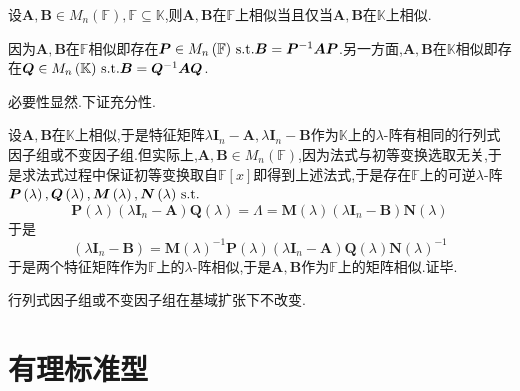 \begin{formal}
\begin{theorem}[相似关系的扩张]\label{thm:相似关系的扩张}
    设$\bm{A},\bm{B}\in M_n\left(\mathbb{F}\right),\mathbb{F}\subseteq \mathbb{K}$,则$\bm{A},\bm{B}$在$\mathbb{F}$上相似当且仅当$\bm{A},\bm{B}$在$\mathbb{K}$上相似.
\end{theorem}
\begin{Proof}
因为$\bm{A},\bm{B}$在$\mathbb{F}$相似即存在$\bm{P}\in M_n\left(\mathbb{F}\right)\,\textup{s.t.}\bm{B}=\bm{P}^{-1}\bm{AP}$.另一方面,$\bm{A},\bm{B}$在$\mathbb{K}$相似即存在$\bm{Q}\in M_n\left(\mathbb{K}\right)\,\textup{s.t.}\bm{B}=\bm{Q}^{-1}\bm{AQ}$.

必要性显然.下证充分性.

设$\bm{A},\bm{B}$在$\mathbb{K}$上相似,于是特征矩阵$\lambda\bm{I}_n-\bm{A},\lambda\bm{I}_n-\bm{B}$作为$\mathbb{K}$上的$\lambda$-阵有相同的行列式因子组或不变因子组.但实际上,$\bm{A},\bm{B}\in M_n\left(\mathbb{F}\right)$,因为法式与初等变换选取无关,于是求法式过程中保证初等变换取自$\mathbb{F}\left[x\right]$即得到上述法式,于是存在$\mathbb{F}$上的可逆$\lambda$-阵$\bm{P}\left(\lambda\right),\bm{Q}\left(\lambda\right),\bm{M}\left(\lambda\right),\bm{N}\left(\lambda\right)\,\textup{s.t.}$
\[
\bm{P}\left(\lambda\right)\left(\lambda\bm{I}_n-\bm{A}\right)\bm{Q}\left(\lambda\right)=\bm{\varLambda}=\bm{M}\left(\lambda\right)\left(\lambda\bm{I}_n-\bm{B}\right)\bm{N}\left(\lambda\right)
\]于是
\[
\left(\lambda\bm{I}_n-\bm{B}\right)=
\bm{M}\left(\lambda\right)^{-1}
\bm{P}\left(\lambda\right)\left(\lambda\bm{I}_n-\bm{A}\right)\bm{Q}\left(\lambda\right)
\bm{N}\left(\lambda\right)^{-1}
\]
于是两个特征矩阵作为$\mathbb{F}$上的$\lambda$-阵相似,于是$\bm{A},\bm{B}$作为$\mathbb{F}$上的矩阵相似.证毕.
\end{Proof}
\end{formal}
\begin{green}
\begin{corollary}[不变因子扩张]\label{cor:不变因子扩张}
    行列式因子组或不变因子组在基域扩张下不改变.
\end{corollary}
\end{green}
\newpage
\section{有理标准型}
